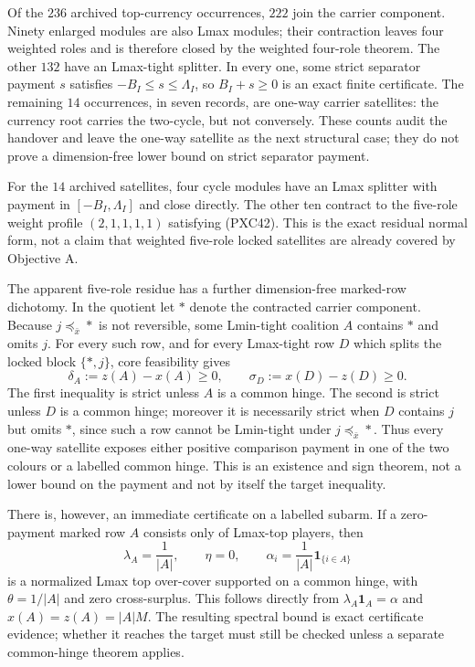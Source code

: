\documentclass[11pt]{article}
\begin{document}
Of the $236$ archived top-currency occurrences, $222$ join the carrier
component.  Ninety enlarged modules are also Lmax modules; their contraction
leaves four weighted roles and is therefore closed by the weighted
four-role theorem.  The other $132$ have an Lmax-tight splitter.  In every
one, some strict separator payment $s$ satisfies
$-B_I\le s\le\Lambda_I$, so $B_I+s\ge0$ is an exact finite certificate.
The remaining $14$ occurrences, in seven records, are one-way carrier
satellites: the currency root carries the two-cycle, but not conversely.
These counts audit the handover and leave the one-way satellite as the next
structural case; they do not prove a dimension-free lower bound on strict
separator payment.

For the $14$ archived satellites, four cycle modules have an Lmax splitter
with payment in $[-B_I,\Lambda_I]$ and close directly.  The other ten
contract to the five-role weight profile $(2,1,1,1,1)$ satisfying (PXC42).
This is the exact residual normal form, not a claim that weighted five-role
locked satellites are already covered by Objective A.

The apparent five-role residue has a further dimension-free marked-row
dichotomy.  In the quotient let $*$ denote the contracted carrier component.
Because $j\preceq_{\bar x}*$ is not reversible, some Lmin-tight coalition
$A$ contains $*$ and omits $j$.  For every such row, and for every Lmax-tight
row $D$ which splits the locked block $\{*,j\}$, core feasibility gives
\[
 \delta_A:=z(A)-x(A)\ge0,
 \qquad
 \sigma_D:=x(D)-z(D)\ge0.                         \tag{PXC44}
\]
The first inequality is strict unless $A$ is a common hinge.  The second is
strict unless $D$ is a common hinge; moreover it is necessarily strict when
$D$ contains $j$ but omits $*$, since such a row cannot be Lmin-tight under
$j\preceq_{\bar x}*$.  Thus every one-way satellite exposes either positive
comparison payment in one of the two colours or a labelled common hinge.
This is an existence and sign theorem, not a lower bound on the payment and
not by itself the target inequality.

There is, however, an immediate certificate on a labelled subarm.  If a
zero-payment marked row $A$ consists only of Lmax-top players, then
\[
 \lambda_A=\frac1{|A|},\qquad \eta=0,\qquad
 \alpha_i=\frac1{|A|}\mathbf1_{\{i\in A\}}              \tag{PXC45}
\]
is a normalized Lmax top over-cover supported on a common hinge, with
$\theta=1/|A|$ and zero cross-surplus.  This follows directly from
$\lambda_A\mathbf1_A=\alpha$ and $x(A)=z(A)=|A|M$.  The resulting spectral
bound is exact certificate evidence; whether it reaches the target must still
be checked unless a separate common-hinge theorem applies.
\end{document}
